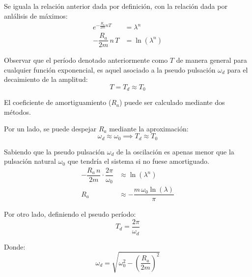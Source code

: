 Se iguala la relación anterior dada por definición, con la relación dada por anlálisis de máximos:
\begin{align*}
    e^{-\tfrac{R_a}{2m} nT} &= \lambda^n
    \\
    -\dfrac{R_a}{2m} \, n \, T &= \ln (\lambda^n)
\end{align*}

Observar que el período denotado anteriormente como $T$ de manera general para cualquier función exponencial, es aquel asociado a la pseudo pulsación $\omega_d$ para el decaimiento de la amplitud:
\begin{equation*}
    T = T_d \approx T_0
\end{equation*}

El coeficiente de amortiguamiento ($R_a$) puede ser calculado mediante dos métodos.

Por un lado, se puede despejar $R_a$ mediante la aproximación:
\begin{equation*}
    \omega_d \approx \omega_0 \implies T_d \approx T_0
\end{equation*}

Sabiendo que la pseudo pulsación $\omega_d$ de la oscilación es apenas menor que la pulsación natural $\omega_0$ que tendría el sistema si no fuese amortiguado.
\begin{align*}
    -\dfrac{R_a \, n}{2m} \cdot \dfrac{2 \pi}{\omega_0} &\approx \ln (\lambda^n)
    \\
    R_a &\approx -\dfrac{m \, \omega_0 \ln (\lambda)}{\pi}
\end{align*}

Por otro lado, definiendo el pseudo período:
\begin{equation*}
    T_d=\frac{2\pi}{\omega_d}
\end{equation*}

Donde:
\begin{equation*}
    \omega_d=\sqrt{\omega_0^2-\left(\frac{R_a}{2m}\right)^2}
\end{equation*}

